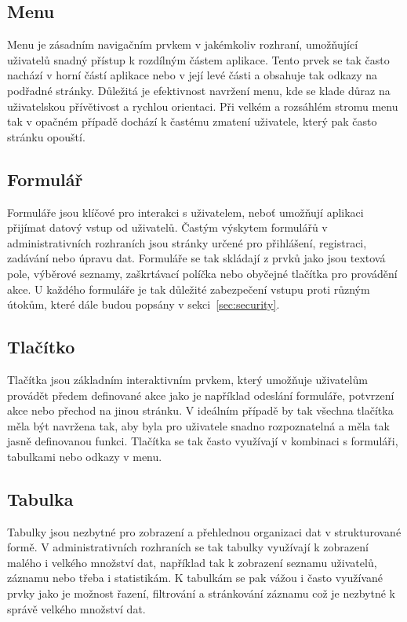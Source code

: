 \subsection{Menu}
\label{subsec:admin-tags-menu}
Menu je zásadním navigačním prvkem v jakémkoliv rozhraní, umožňující uživatelů snadný přístup k rozdílným částem aplikace. Tento prvek se tak často nachází v horní částí aplikace nebo v její levé části a obsahuje tak odkazy na podřadné stránky. Důležitá je efektivnost navržení menu, kde se klade důraz na uživatelskou přívětivost a rychlou orientaci. Při velkém a rozsáhlém stromu menu tak v opačném případě dochází k častému zmatení uživatele, který pak často stránku opouští.

\subsection{Formulář}
\label{subsec:admin-tags-form}
Formuláře jsou klíčové pro interakci s uživatelem, neboť umožňují aplikaci přijímat datový vstup od uživatelů. Častým výskytem formulářů v administrativních rozhraních jsou stránky určené pro přihlášení, registraci, zadávání nebo úpravu dat. Formuláře se tak skládají z prvků jako jsou textová pole, výběrové seznamy, zaškrtávací políčka nebo obyčejné tlačítka pro provádění akce. U každého formuláře je tak důležité zabezpečení vstupu proti různým útokům, které dále budou popsány v sekci~\ref{sec:security}.

\subsection{Tlačítko}
\label{subsec:admin-tags-button}
Tlačítka jsou základním interaktivním prvkem, který umožňuje uživatelům provádět předem definované akce jako je například odeslání formuláře, potvrzení akce nebo přechod na jinou stránku. V ideálním případě by tak všechna tlačítka měla být navržena tak, aby byla pro uživatele snadno rozpoznatelná a měla tak jasně definovanou funkci. Tlačítka se tak často využívají v kombinaci s formuláři, tabulkami nebo odkazy v menu.

\subsection{Tabulka}
\label{subsec:admin-tags-table}
Tabulky jsou nezbytné pro zobrazení a přehlednou organizaci dat v strukturované formě. V administrativních rozhraních se tak tabulky využívají k zobrazení malého i velkého množství dat, například tak k zobrazení seznamu uživatelů, záznamu nebo třeba i statistikám. K tabulkám se pak vážou i často využívané prvky jako je možnost řazení, filtrování a stránkování záznamu což je nezbytné k správě velkého množství dat.

